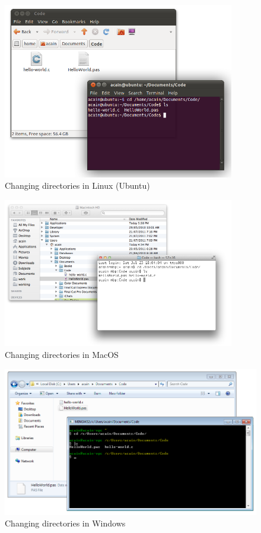 \begin{figure}[p]
   \centering
   \includegraphics[width=0.9\textwidth]{./topics/programs-and-compilers/images/LinuxFiles} 
   \caption{Changing directories in Linux (Ubuntu)}
   \label{fig:linux-files}
\end{figure}

\begin{figure}[p]
   \centering
   \includegraphics[width=0.9\textwidth]{./topics/programs-and-compilers/images/MacFiles} 
   \caption{Changing directories in MacOS}
   \label{fig:mac-files}
\end{figure}


\begin{figure}[p]
   \centering
   \includegraphics[width=\textwidth]{./topics/programs-and-compilers/images/WindowsFiles} 
   \caption{Changing directories in Windows}
   \label{fig:win-files}
\end{figure}




